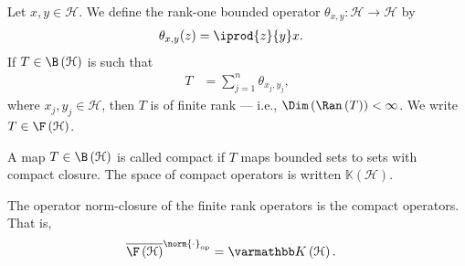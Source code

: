 \begin{definition}
  Let $x,y\in \mathcal{H}$. We define the rank-one bounded operator $\theta_{x,y}\colon \mathcal{H}\rightarrow \mathcal{H}$ by
  \begin{align*}
    \theta_{x,y}(z) &= \iprod{z}{y}x.
  \end{align*}
  If $T\in \B\left(\mathcal{H}\right)$ is such that
  \begin{align*}
    T &= \sum_{j=1}^{n}\theta_{x_j,y_j},
  \end{align*}
  where $x_j,y_j\in \mathcal{H}$, then $T$ is of finite rank --- i.e., $\Dim\left(\Ran\left(T\right)\right) < \infty$. We write $T\in \F\left(\mathcal{H}\right)$.\newline

  A map $T\in \B\left(\mathcal{H}\right)$ is called compact if $T$ maps bounded sets to sets with compact closure. The space of compact operators is written $\mathbb{K}\left(\mathcal{H}\right)$.
\end{definition}
\begin{theorem}
  The operator norm-closure of the finite rank operators is the compact operators. That is,
  \begin{align*}
    \overline{\F\left(\mathcal{H}\right)}^{\norm{\cdot}_{\op}} &= \mathbb{K}\left(\mathcal{H}\right).
  \end{align*}
\end{theorem}

